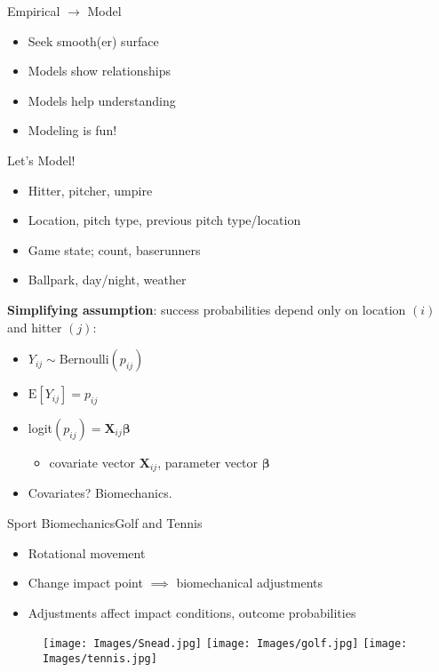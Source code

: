 \documentclass{beamer}
\begin{document}
\begin{frame}{Empirical $\rightarrow$ Model}{}
\begin{itemize}
\addtolength{\itemsep}{0.5\baselineskip}
\item Seek smooth(er) surface
\item Models show relationships
\item Models help understanding
\item Modeling is fun!
\end{itemize}
\end{frame}


\begin{frame}{Let's Model!}{} %
\begin{itemize}
\addtolength{\itemsep}{0.5\baselineskip}
\item Hitter, pitcher, umpire
\item Location, pitch type, previous pitch type/location 
\item Game state; count, baserunners
\item Ballpark, day/night, weather
\end{itemize}

{\bf Simplifying assumption}: success probabilities depend only on location $(i)$ and hitter $(j)$: \\

\begin{itemize}
\addtolength{\itemsep}{0.5\baselineskip}
\item $Y_{ij} \sim \text{Bernoulli}(p_{ij})$
\item $\text{E}[Y_{ij}] = p_{ij}$
\item logit$(p_{ij}) = \pmb{X}_{ij} \pmb{\beta}$
    \begin{itemize}
    \item  covariate vector $\pmb{X}_{ij}$, parameter vector $\pmb{\beta}$
    \end{itemize}
\item Covariates? Biomechanics.
\end{itemize}
\end{frame}

\begin{frame}{Sport Biomechanics}{Golf and Tennis} %

\begin{itemize}
\item Rotational movement
\item Change impact point $\implies$ biomechanical
adjustments
\item Adjustments affect impact conditions, outcome probabilities
\end{itemize}

  \begin{figure}[H]
	\centering
	\texttt{[image: Images/Snead.jpg]}
	\texttt{[image: Images/golf.jpg]}
	\texttt{[image: Images/tennis.jpg]}

	\end{figure}

\end{frame}
\end{document}
